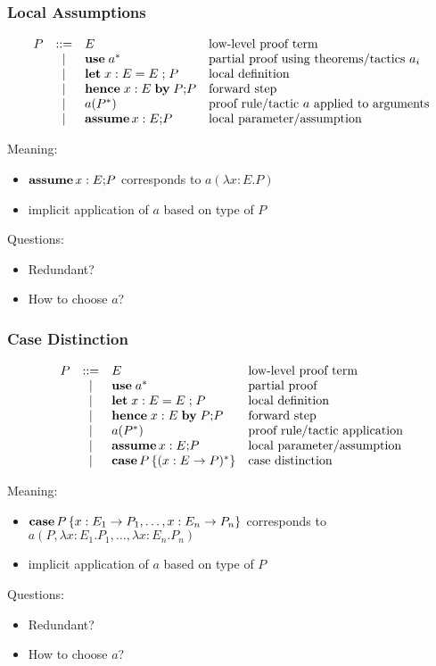 \documentclass{beamer}
\begin{document}
\begin{frame}\frametitle{Local Assumptions}
\[
\begin{array}{lcll}
P       &::=& E & \text{low-level proof term}\\
        &|&   \mathbf{use}\; a^* & \text{partial proof using theorems/tactics $a_i$}\\
        &|&   \mathbf{let}\; x:E=E\; \mathbf{;}\; P & \text{local definition}\\
        &|&   \mathbf{hence}\;x:E\; \mathbf{by}\; P\mathbf{;} P & \text{forward step} \\
        &|&   a(P^*) & \text{proof rule/tactic $a$ applied to arguments} \\
        &|&   \mathbf{assume}\, x:E\mathbf{;} P & \text{local parameter/assumption} \\
\end{array}
\]

Meaning:
\begin{itemize}
\item $\mathbf{assume}\, x:E\mathbf{;} P$ corresponds to $a(\lambda x:E.P)$
\item implicit application of $a$ based on type of $P$
\end{itemize}

Questions:
\begin{itemize}
\item Redundant?
\item How to choose $a$?
\end{itemize}
\end{frame}

\begin{frame}\frametitle{Case Distinction}
\[
\begin{array}{lcll}
P       &::=& E & \text{low-level proof term}\\
        &|&   \mathbf{use}\; a^* & \text{partial proof}\\
        &|&   \mathbf{let}\; x:E=E\; \mathbf{;}\; P & \text{local definition}\\
        &|&   \mathbf{hence}\;x:E\; \mathbf{by}\; P\mathbf{;} P & \text{forward step} \\
        &|&   a(P^*) & \text{proof rule/tactic application} \\
        &|&   \mathbf{assume}\, x:E\mathbf{;} P & \text{local parameter/assumption} \\
        &|&   \mathbf{case}\, P\, \{(x:E \to P)^*\} & \text{case distinction} \\
\end{array}
\]

Meaning:
\begin{itemize}
\item $\mathbf{case}\, P\,\{x:E_1 \to P_1, \ldots, x:E_n\to P_n\}$ corresponds to $a(P, \lambda x:E_1.P_1, \ldots, \lambda x:E_n.P_n)$
\item implicit application of $a$ based on type of $P$
\end{itemize}

Questions:
\begin{itemize}
\item Redundant?
\item How to choose $a$?
\end{itemize}
\end{frame}
\end{document}
